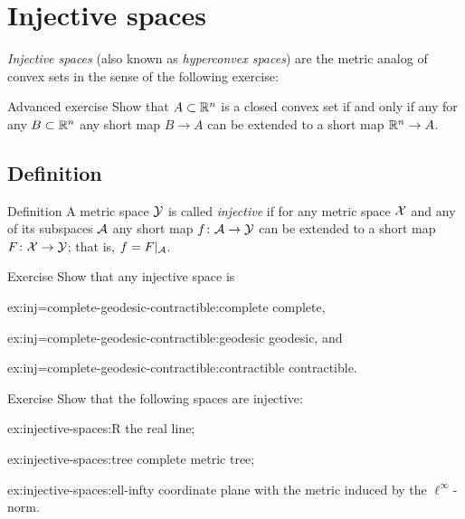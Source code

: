 \chapter{Injective spaces}

\textit{Injective spaces} (also known as \textit{hyperconvex spaces}) are the metric analog of convex sets in the sense of the following exercise:

\begin{thm}{Advanced exercise}\label{ex:conv-short}
Show that $A\subset \mathbb{R}^n$ is a closed convex set if and only if
any for any  $B\subset \mathbb{R}^n$ any short map $B\to A$ can be extended to a short map $\mathbb{R}^n\to A$.
\end{thm}

\section{Definition}

\begin{thm}{Definition}\label{def:injective}
A metric space $\mathcal{Y}$ is called \emph{injective} if for any metric space $\mathcal{X}$ and any of its subspaces $\mathcal{A}$
any short map $f\colon\mathcal{A}\to \mathcal{Y}$ can be extended to a short map $F\colon\mathcal{X}\to \mathcal{Y}$;
that is, $f=F|_{\mathcal{A}}$.
\end{thm}

\begin{thm}{Exercise}\label{ex:inj=complete-geodesic-contractible}
Show that any injective space is 
\begin{multicols}{3}

\begin{subthm}{ex:inj=complete-geodesic-contractible:complete}
complete,
\end{subthm}

\begin{subthm}{ex:inj=complete-geodesic-contractible:geodesic}
geodesic, and
\end{subthm}

\begin{subthm}{ex:inj=complete-geodesic-contractible:contractible}
contractible.
\end{subthm}

\end{multicols}

\end{thm}


\begin{thm}{Exercise}\label{ex:injective-spaces}
Show that the following spaces are injective:
\begin{subthm}{ex:injective-spaces:R}
the real line;
\end{subthm}


\begin{subthm}{ex:injective-spaces:tree}
complete metric tree;
\end{subthm}

\begin{subthm}{ex:injective-spaces:ell-infty}
coordinate plane with the metric induced by the $\ell^\infty$-norm.
\end{subthm}

\end{thm}

